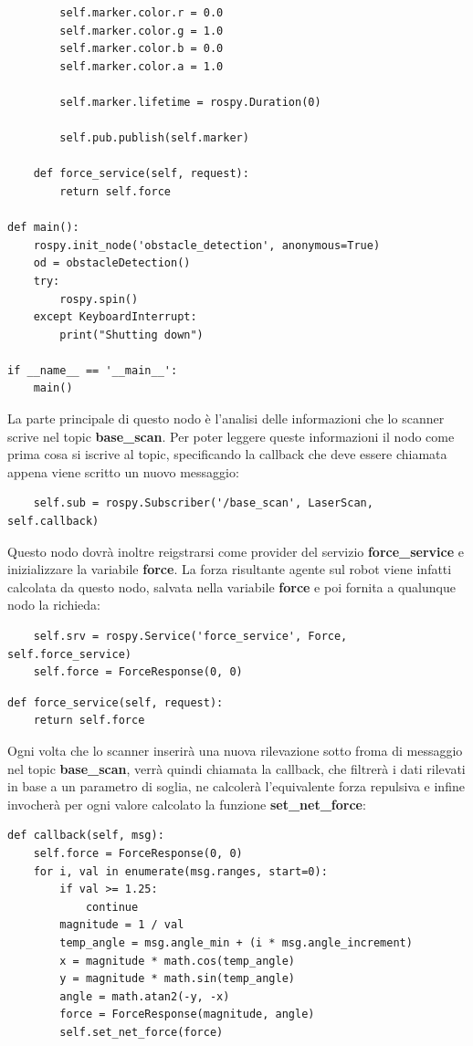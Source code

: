 \documentclass[Lau, binding=0.6cm, oneside]{sapthesis}
\begin{document}
\begin{lstlisting}
        self.marker.color.r = 0.0
        self.marker.color.g = 1.0
        self.marker.color.b = 0.0
        self.marker.color.a = 1.0

        self.marker.lifetime = rospy.Duration(0)

        self.pub.publish(self.marker)

    def force_service(self, request):
        return self.force

def main():
    rospy.init_node('obstacle_detection', anonymous=True)
    od = obstacleDetection()
    try:
        rospy.spin()
    except KeyboardInterrupt:
        print("Shutting down")

if __name__ == '__main__':
    main()
\end{lstlisting}

La parte principale di questo nodo è l'analisi delle informazioni che lo scanner scrive nel topic \textbf{base\_scan}.
Per poter leggere queste informazioni il nodo come prima cosa si iscrive al topic, specificando la callback che deve essere chiamata appena viene scritto un nuovo messaggio:

\begin{lstlisting}
	self.sub = rospy.Subscriber('/base_scan', LaserScan, self.callback)
\end{lstlisting}

Questo nodo dovrà inoltre reigstrarsi come provider del servizio \textbf{force\_service} e inizializzare la variabile \textbf{force}.
La forza risultante agente sul robot viene infatti calcolata da questo nodo, salvata nella variabile \textbf{force} e poi fornita a qualunque nodo la richieda:

\begin{lstlisting}
    self.srv = rospy.Service('force_service', Force, self.force_service)
    self.force = ForceResponse(0, 0)
\end{lstlisting}

\begin{lstlisting}
def force_service(self, request):
    return self.force
\end{lstlisting}

Ogni volta che lo scanner inserirà una nuova rilevazione sotto froma di messaggio nel topic \textbf{base\_scan}, verrà quindi chiamata la callback, che filtrerà i dati rilevati in base a un parametro di soglia, ne calcolerà l'equivalente forza repulsiva e infine invocherà per ogni valore calcolato la funzione \textbf{set\_net\_force}:

\begin{lstlisting}
def callback(self, msg):
    self.force = ForceResponse(0, 0)
    for i, val in enumerate(msg.ranges, start=0):
        if val >= 1.25:
            continue
        magnitude = 1 / val
        temp_angle = msg.angle_min + (i * msg.angle_increment)
        x = magnitude * math.cos(temp_angle)
        y = magnitude * math.sin(temp_angle)
        angle = math.atan2(-y, -x)
        force = ForceResponse(magnitude, angle)
        self.set_net_force(force)
\end{lstlisting}
\end{document}
